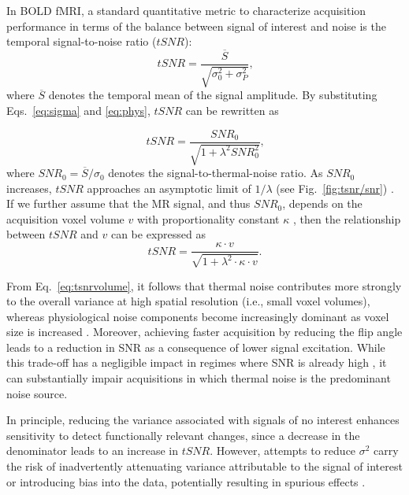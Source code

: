 In BOLD fMRI, a standard quantitative metric to characterize acquisition performance in terms of the balance between signal of interest and noise is the temporal signal-to-noise ratio ($tSNR$):
\begin{equation}
    tSNR=\frac{\overline{S}}{\sqrt{\sigma^{2}_{0}+\sigma^{2}_{P}}}\text{,}
\end{equation}
where $\overline{S}$ denotes the temporal mean of the signal amplitude. By substituting Eqs.~\ref{eq:sigma} and \ref{eq:phys}, $tSNR$ can be rewritten as

\begin{equation}
    tSNR = \frac{SNR_0}{\sqrt{1 + \lambda^2 SNR_0^2}}\text{,}
\end{equation}
where $SNR_0 = \overline{S}/\sigma_0$ denotes the signal-to-thermal-noise ratio. As $SNR_0$ increases, $tSNR$ approaches an asymptotic limit of $1/\lambda$ (see Fig.~\ref{fig:tsnr/snr}) \citep{krugerNeuroimaging15302001}. If we further assume that the MR signal, and thus $SNR_0$, depends on the acquisition voxel volume $v$ with proportionality constant $\kappa$ \citep{bodurkaMappingMRIVoxel2007, murphyHowLongScan2007}, then the relationship between $tSNR$ and $v$ can be expressed as 
\begin{equation}\label{eq:tsnrvolume}
    tSNR = \frac{\kappa \cdot v}{\sqrt{1 + \lambda^2 \cdot \kappa \cdot v}}\text{.}
\end{equation}

From Eq.~\ref{eq:tsnrvolume}, it follows that thermal noise contributes more strongly to the overall variance at high spatial resolution (i.e., small voxel volumes), whereas physiological noise components become increasingly dominant as voxel size is increased \citep{triantafyllouPhysiologicalNoiseSignaltonoise2011}. Moreover, achieving faster acquisition by reducing the flip angle leads to a reduction in SNR as a consequence of lower signal excitation. While this trade-off has a negligible impact in regimes where SNR is already high \citep{gonzalez-castilloPhysiologicalNoiseEffects2011}, it can substantially impair acquisitions in which thermal noise is the predominant noise source. 

In principle, reducing the variance associated with signals of no interest enhances sensitivity to detect functionally relevant changes, since a decrease in the denominator leads to an increase in $tSNR$. However, attempts to reduce $\sigma^2$ carry the risk of inadvertently attenuating variance attributable to the signal of interest or introducing bias into the data, potentially resulting in spurious effects \citep{kay2022riskL}.

